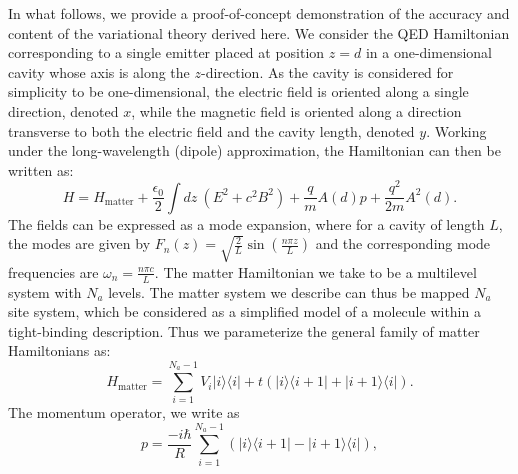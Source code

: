 \documentclass[aps,prl,twocolumn,
	groupedaddress,superscriptaddress,
	amsfonts,amssymb,amsmath,floatfix,
	citeautoscript]{revtex4-1}
\begin{document}
In what follows, we provide a proof-of-concept demonstration of the accuracy and content of the variational theory derived here. We consider the QED Hamiltonian corresponding to a single emitter placed at position $z=d$ in a one-dimensional cavity whose axis is along the $z$-direction. As the cavity is considered for simplicity to be one-dimensional, the electric field is oriented along a single direction, denoted $x$, while the magnetic field is oriented along a direction transverse to both the electric field and the cavity length, denoted $y$. Working under the long-wavelength (dipole) approximation, the Hamiltonian can then be written as:
\begin{equation}\label{eq:hamiltonian}
H = H_{\text{matter}}+\frac{\epsilon_0}{2}\int dz~(E^2+c^2B^2)+\frac{q}{m}A(d)p + \frac{q^2}{2m}A^2(d).
\end{equation}
The fields can be expressed as a mode expansion, where for a cavity of length $L$, the modes are given by $F_n(z) = \sqrt{\frac{2}{L}}\sin\left(\frac{n\pi z}{L} \right)$ and the corresponding mode frequencies are $\omega_n = \frac{n\pi c}{L}$. The matter Hamiltonian we take to be a multilevel system with $N_a$ levels. The matter system we describe can thus be mapped $N_a$ site system, which be considered as a simplified model of a molecule within a tight-binding description. Thus we parameterize the general family of matter Hamiltonians as:
\begin{equation}\label{eq:matter_hamiltonian}
H_{\text{matter}} = \sum\limits_{i=1}^{{N_a-1}} V_i|i\rangle\langle i|+t(|i\rangle\langle i+1|+|i+1\rangle\langle i|).
\end{equation}
The momentum operator, we write as 
\begin{equation}\label{eq:momentum_operator}
p = \frac{-i\hbar}{R}\sum\limits_{i=1}^{N_a-1} \left(|i\rangle\langle i+1|-|i+1\rangle\langle i| \right),
\end{equation}
\end{document}
